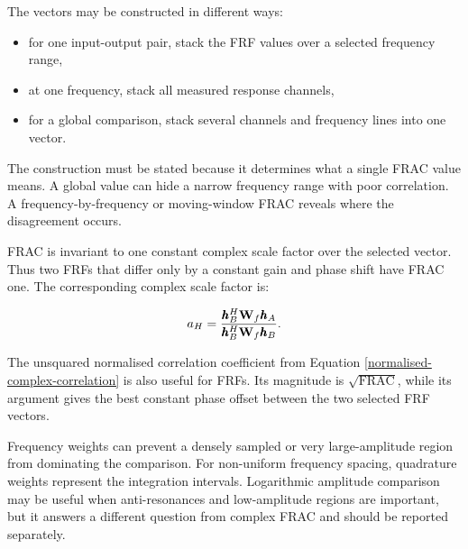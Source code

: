 The vectors may be constructed in different ways:

\begin{itemize}
    \item for one input-output pair, stack the FRF values over a selected
          frequency range,
    \item at one frequency, stack all measured response channels,
    \item for a global comparison, stack several channels and frequency lines
          into one vector.
\end{itemize}

The construction must be stated because it determines what a single FRAC value
means. A global value can hide a narrow frequency range with poor correlation.
A frequency-by-frequency or moving-window FRAC reveals where the disagreement
occurs.

FRAC is invariant to one constant complex scale factor over the selected vector.
Thus two FRFs that differ only by a constant gain and phase shift have FRAC one.
The corresponding complex scale factor is:

\begin{equation}\label{frf-scale-factor}
    a_H=
    \frac{\pmb{h}_B^H\mathbf{W}_f\pmb{h}_A}
         {\pmb{h}_B^H\mathbf{W}_f\pmb{h}_B}.
\end{equation}

The unsquared normalised correlation coefficient from Equation
\eqref{normalised-complex-correlation} is also useful for FRFs. Its magnitude is
$\sqrt{\operatorname{FRAC}}$, while its argument gives the best constant phase
offset between the two selected FRF vectors.

Frequency weights can prevent a densely sampled or very large-amplitude region
from dominating the comparison. For non-uniform frequency spacing, quadrature
weights represent the integration intervals. Logarithmic amplitude comparison
may be useful when anti-resonances and low-amplitude regions are important, but
it answers a different question from complex FRAC and should be reported
separately.

